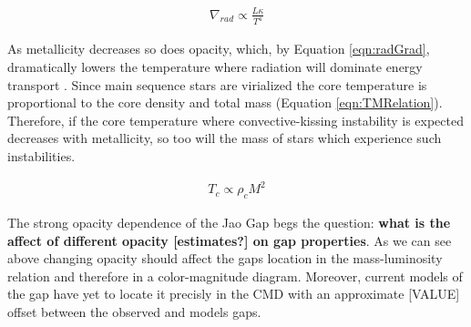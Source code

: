 \begin{align}\label{eqn:radGrad}
	\nabla_{rad} \propto \frac{L\kappa}{T^{4}}
\end{align}

As metallicity decreases so does opacity, which, by Equation \ref{eqn:radGrad},
dramatically lowers the temperature where radiation will dominate energy transport
\citep{Chabrier1997}. Since main sequence stars are virialized the core
temperature is proportional to the core density and total mass (Equation
\ref{eqn:TMRelation}). Therefore, if the core temperature where
convective-kissing instability is expected decreases with metallicity, so too
will the mass of stars which experience such instabilities.

\begin{align}\label{eqn:TMRelation}
	T_{c} \propto \rho_{c}M^{2}
\end{align}

The strong opacity dependence of the Jao Gap begs the question: \textbf{what is
the affect of different opacity {\color{red} [estimates?]} on gap properties}.
As we can see above changing opacity should affect the gaps location in the
mass-luminosity relation and therefore in a color-magnitude diagram. Moreover,
current models of the gap have yet to locate it precisly in the CMD
\citep{Feiden2021} with an approximate {\color{red} [VALUE]} offset between the
observed and models gaps. 
